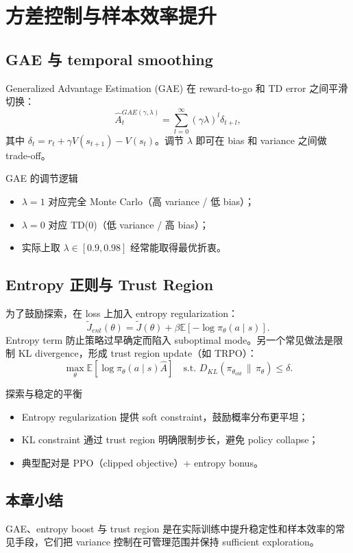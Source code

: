 \section{方差控制与样本效率提升}
\subsection{GAE 与 temporal smoothing}
Generalized Advantage Estimation (GAE) 在 reward-to-go 和 TD error 之间平滑切换：
$$\hat{A}_t^{GAE(\gamma,\lambda)} = \sum_{l=0}^{\infty}(\gamma\lambda)^l \delta_{t+l},$$
其中 $\delta_t = r_t + \gamma V(s_{t+1}) - V(s_t)$。调节 $\lambda$ 即可在 bias 和 variance 之间做 trade-off。

\begin{importantbox}{GAE 的调节逻辑}
\begin{itemize}
    \item $\lambda=1$ 对应完全 Monte Carlo（高 variance / 低 bias）；
    \item $\lambda=0$ 对应 TD(0)（低 variance / 高 bias）；
    \item 实际上取 $\lambda \in [0.9,0.98]$ 经常能取得最优折衷。
\end{itemize}
\end{importantbox}

\subsection{Entropy 正则与 Trust Region}
为了鼓励探索，在 loss 上加入 entropy regularization：
$$\tilde{J}_{ent}(\theta) = \tilde{J}(\theta) + \beta \mathbb{E}[-\log \pi_\theta(a\mid s)].$$
Entropy term 防止策略过早确定而陷入 suboptimal mode。另一个常见做法是限制 KL divergence，形成 trust region update（如 TRPO）：
$$\max_\theta \mathbb{E}[\log \pi_\theta(a\mid s) \hat{A}] \quad \text{s.t. } D_{KL}(\pi_{\theta_{old}} \,\|\, \pi_\theta) \le \delta.$$

\begin{knowledgebox}{探索与稳定的平衡}
\begin{itemize}
    \item Entropy regularization 提供 soft constraint，鼓励概率分布更平坦；
    \item KL constraint 通过 trust region 明确限制步长，避免 policy collapse；
    \item 典型配对是 PPO（clipped objective）+ entropy bonus。
\end{itemize}
\end{knowledgebox}

\subsection{本章小结}
GAE、entropy boost 与 trust region 是在实际训练中提升稳定性和样本效率的常见手段，它们把 variance 控制在可管理范围并保持 sufficient exploration。

